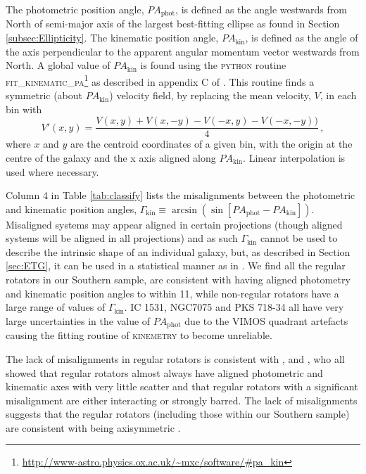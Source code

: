 			The photometric position angle, $PA_\text{phot}$, is defined as the angle westwards from North of semi-major axis of the largest best-fitting ellipse as found in Section \ref{subsec:Ellipticity}. The kinematic position angle, $PA_\text{kin}$, is defined as the angle of the axis perpendicular to the apparent angular momentum vector westwards from North. A global value of $PA_\text{kin}$ is found using the \textsc{python} routine \textsc{fit\_kinematic\_pa}\footnote{\url{http://www-astro.physics.ox.ac.uk/\~mxc/software/\#pa\_kin}} as described in appendix C of \citet{Krajnovic2006}. This routine finds a symmetric (about $PA_\text{kin}$) velocity field, by replacing the mean velocity, $V$, in each bin with
			\begin{equation}
				V'(x, y) = \frac{V(x,y) + V(x, -y) - V(-x,y) - V(-x,-y))}{4} \,,
			\end{equation}
			where $x$ and $y$ are the centroid coordinates of a given bin, with the origin at the centre of the galaxy and the x axis aligned along $PA_\text{kin}$. Linear interpolation is used where necessary.

			Column 4 in Table \ref{tab:classify} lists the misalignments between the photometric and kinematic position angles, $\Gamma_\text{kin} \equiv \arcsin(\sin[PA_\text{phot} - PA_\text{kin}])$. Misaligned systems may appear aligned in certain projections (though aligned systems will be aligned in all projections) and as such $\Gamma_\text{kin}$ cannot be used to describe the intrinsic shape of an individual galaxy, but, as described in Section \ref{sec:ETG}, it can be used in a statistical manner as in \citet{Cappellari2007}. We find all the regular rotators in our Southern sample, are consistent with having aligned photometry and kinematic position angles to within 11\degree, while non-regular rotators have a large range of values of $\Gamma_\text{kin}$. IC 1531, NGC7075 and PKS 718-34 all have very large uncertainties in the value of $PA_\text{phot}$ due to the VIMOS quadrant artefacts causing the fitting routine of \textsc{kinemetry} to become unreliable. 

			The lack of misalignments in regular rotators is consistent with \citet{Cappellari2007}, \citet{Krajnovic2011} and \citet{Fogarty2015}, who all showed that regular rotators almost always have aligned photometric and kinematic axes with very little scatter and that regular rotators with a significant misalignment are either interacting or strongly barred. The lack of misalignments suggests that the regular rotators (including those within our Southern sample) are consistent with being axisymmetric \citep{Cappellari2016}.

